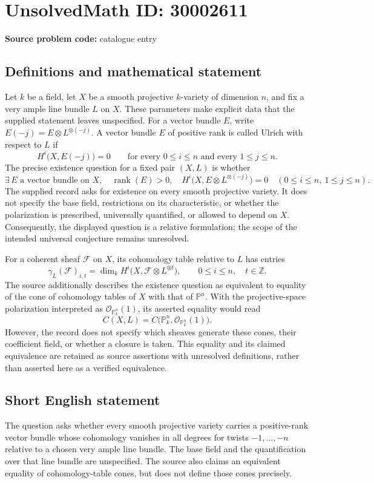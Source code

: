 \documentclass[11pt]{article}
\newcommand{\Z}{\mathbb{Z}}
\newcommand{\PP}{\mathbb{P}}
\begin{document}
\section*{UnsolvedMath ID: 30002611}
\textbf{Source problem code:} catalogue entry
\subsection{Definitions and mathematical statement}
Let \(k\) be a field, let \(X\) be a smooth projective \(k\)-variety of dimension \(n\), and fix a very ample line bundle \(L\) on \(X\). These parameters make explicit data that the supplied statement leaves unspecified. For a vector bundle \(E\), write \(E(-j)=E\otimes L^{\otimes(-j)}\). A vector bundle \(E\) of positive rank is called Ulrich with respect to \(L\) if
\[
H^i\bigl(X,E(-j)\bigr)=0
\qquad\text{for every }0\leq i\leq n\text{ and every }1\leq j\leq n.
\]
The precise existence question for a fixed pair \((X,L)\) is whether
\[
\exists\,E\text{ a vector bundle on }X,\quad \operatorname{rank}(E)>0,
\quad H^i\bigl(X,E\otimes L^{\otimes(-j)}\bigr)=0
\quad(0\leq i\leq n,\ 1\leq j\leq n).
\]
The supplied record asks for existence on every smooth projective variety. It does not specify the base field, restrictions on its characteristic, or whether the polarization is prescribed, universally quantified, or allowed to depend on \(X\). Consequently, the displayed question is a relative formulation; the scope of the intended universal conjecture remains unresolved.

For a coherent sheaf \(\mathcal F\) on \(X\), its cohomology table relative to \(L\) has entries
\[
\gamma_L(\mathcal F)_{i,t}
=\dim_k H^i\bigl(X,\mathcal F\otimes L^{\otimes t}\bigr),
\qquad 0\leq i\leq n,\quad t\in\Z.
\]
The source additionally describes the existence question as equivalent to equality of the cone of cohomology tables of \(X\) with that of \(\PP^n\). With the projective-space polarization interpreted as \(\mathcal O_{\PP^n_k}(1)\), its asserted equality would read
\[
C(X,L)=C\bigl(\PP^n_k,\mathcal O_{\PP^n_k}(1)\bigr).
\]
However, the record does not specify which sheaves generate these cones, their coefficient field, or whether a closure is taken. This equality and its claimed equivalence are retained as source assertions with unresolved definitions, rather than asserted here as a verified equivalence.
\subsection{Short English statement}
The question asks whether every smooth projective variety carries a positive-rank vector bundle whose cohomology vanishes in all degrees for twists \(-1,\ldots,-n\) relative to a chosen very ample line bundle. The base field and the quantification over that line bundle are unspecified. The source also claims an equivalent equality of cohomology-table cones, but does not define those cones precisely.
\end{document}
